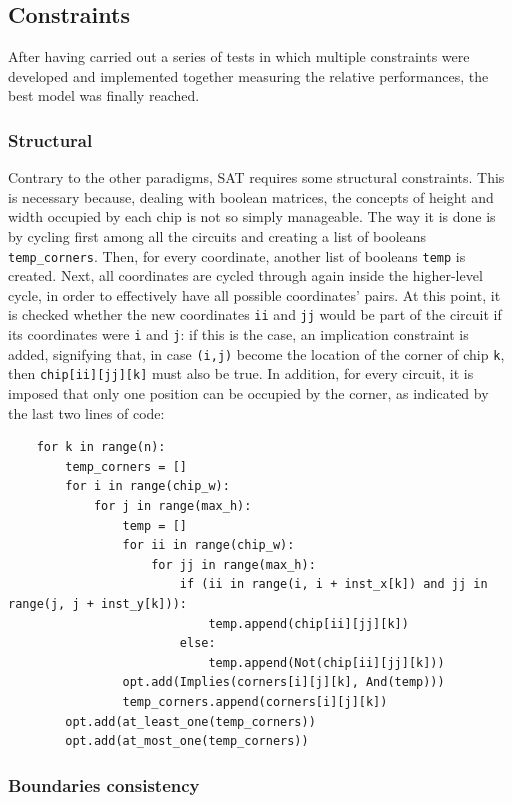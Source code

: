 \documentclass[a4paper, 12pt]{article}
\begin{document}
\subsection{Constraints}

After having carried out a series of tests in which multiple constraints were developed and implemented together measuring the relative performances, the best model was finally reached.


\subsubsection{Structural}

Contrary to the other paradigms, SAT requires some structural constraints. This is necessary because, dealing with boolean matrices, the concepts of height and width occupied by each chip is not so simply manageable. The way it is done is by cycling first among all the circuits and creating a list of booleans \verb|temp_corners|. Then, for every coordinate, another list of booleans \verb|temp| is created. Next, all coordinates are cycled through again inside the higher-level cycle, in order to effectively have all possible coordinates' pairs. At this point, it is checked whether the new coordinates \verb|ii| and \verb|jj| would be part of the circuit if its coordinates were \verb|i| and \verb|j|: if this is the case, an implication constraint is added, signifying that, in case \verb|(i,j)| become the location of the corner of chip \verb|k|, then \verb|chip[ii][jj][k]| must also be true. In addition, for every circuit, it is imposed that only one position can be occupied by the corner, as indicated by the last two lines of code:
\begin{verbatim}
    for k in range(n):
        temp_corners = []
        for i in range(chip_w):
            for j in range(max_h):
                temp = []
                for ii in range(chip_w):
                    for jj in range(max_h):
                        if (ii in range(i, i + inst_x[k]) and jj in range(j, j + inst_y[k])):
                            temp.append(chip[ii][jj][k])
                        else:
                            temp.append(Not(chip[ii][jj][k]))
                opt.add(Implies(corners[i][j][k], And(temp)))
                temp_corners.append(corners[i][j][k])
        opt.add(at_least_one(temp_corners))
        opt.add(at_most_one(temp_corners))
\end{verbatim}


\subsubsection{Boundaries consistency}
\end{document}
